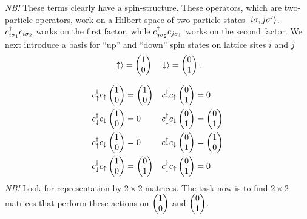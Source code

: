 \emph{NB!} These terms clearly have a spin-structure. These operators, which are two-particle operators, work on a Hilbert-space of two-particle states $\ket{i\sigma,j\sigma'}$.
$\cd_{i\sigma_1}c_{i\sigma_2}$ works on the first factor, while $\cd_{j\sigma_2}c_{j\sigma_1}$ works on the second factor. 
We next introduce a basis for ``up'' and ``down'' spin states on lattice sites $i$ and $j$
\begin{align}
		\ket{\uparrow} = \upm && \ket{\downarrow} = \downm.
\end{align}

\begin{align*}
\cd_{\uparrow}c_{\uparrow}\upm &= \upm & \cd_{\uparrow}c_{\uparrow}\downm &=0 \\
\cd_{\downarrow}c_{\downarrow}\upm &= 0 & \cd_{\downarrow}c_{\downarrow}\downm &= \downm \\
\cd_{\uparrow}c_{\downarrow}\upm &= 0 & \cd_{\uparrow}c_{\downarrow}\downm &= \upm \\
\cd_{\downarrow}c_{\uparrow}\upm &= \downm & \cd_{\downarrow}c_{\uparrow}\downm &= 0 
\end{align*}
\emph{NB!} Look for representation by $2\times2$ matrices. The task now is to find $2\times2$ matrices that perform these actions on $\upm$ and $\downm$.

